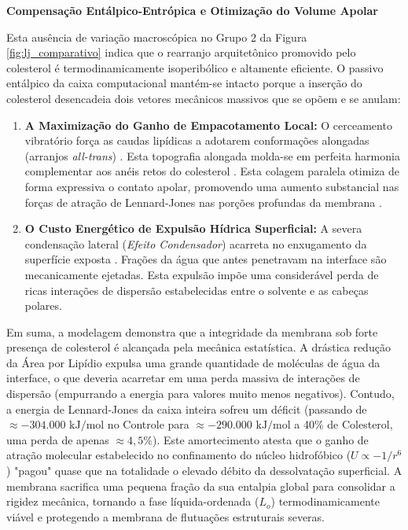 \vspace{1em}
\noindent\textbf{Compensação Entálpico-Entrópica e Otimização do Volume Apolar }  

Esta ausência de variação macroscópica no Grupo 2 da Figura \ref{fig:lj_comparativo} indica que o rearranjo arquitetônico promovido pelo colesterol é termodinamicamente isoperibólico e altamente eficiente. O passivo entálpico da caixa computacional mantém-se intacto porque a inserção do colesterol desencadeia dois vetores mecânicos massivos que se opõem e se anulam:

\begin{enumerate}
    \item \textbf{A Maximização do Ganho de Empacotamento Local:} O cerceamento vibratório força as caudas lipídicas a adotarem conformações alongadas (arranjos \textit{all-trans}) \cite{bennett2018}. Esta topografia alongada molda-se em perfeita harmonia complementar aos anéis retos do colesterol \cite{leeb2018}. Esta colagem paralela otimiza de forma expressiva o contato apolar, promovendo uma aumento substancial nas forças de atração de Lennard-Jones nas porções profundas da membrana \cite{bennett2018}.
    
    \item \textbf{O Custo Energético de Expulsão Hídrica Superficial:} A severa condensação lateral (\textit{Efeito Condensador}) acarreta no enxugamento da superfície exposta \cite{leeb2018}. Frações da água que antes penetravam na interface são mecanicamente ejetadas. Esta expulsão impõe uma considerável perda de ricas interações de dispersão estabelecidas entre o solvente e as cabeças polares.
\end{enumerate}

Em suma, a modelagem demonstra que a integridade da membrana sob forte presença de colesterol é alcançada pela mecânica estatística. A drástica redução da Área por Lipídio expulsa uma grande  quantidade de moléculas de água da interface, o que deveria acarretar em uma perda massiva de interações de dispersão (empurrando a energia para valores muito menos negativos). Contudo, a energia de Lennard-Jones da caixa inteira sofreu um déficit (passando de $\approx -304.000\text{ kJ/mol}$ no Controle para $\approx -290.000\text{ kJ/mol}$ a 40\% de Colesterol, uma perda de apenas $\approx 4,5\%$). Este amortecimento atesta que o ganho de atração molecular estabelecido no confinamento do núcleo hidrofóbico ($U \propto -1/r^6$) "pagou" quase que na totalidade o elevado débito da dessolvatação superficial. A membrana sacrifica uma pequena fração da sua entalpia global para consolidar a rigidez mecânica, tornando a fase líquida-ordenada ($L_o$) termodinamicamente viável e protegendo a membrana de flutuações estruturais severas.

